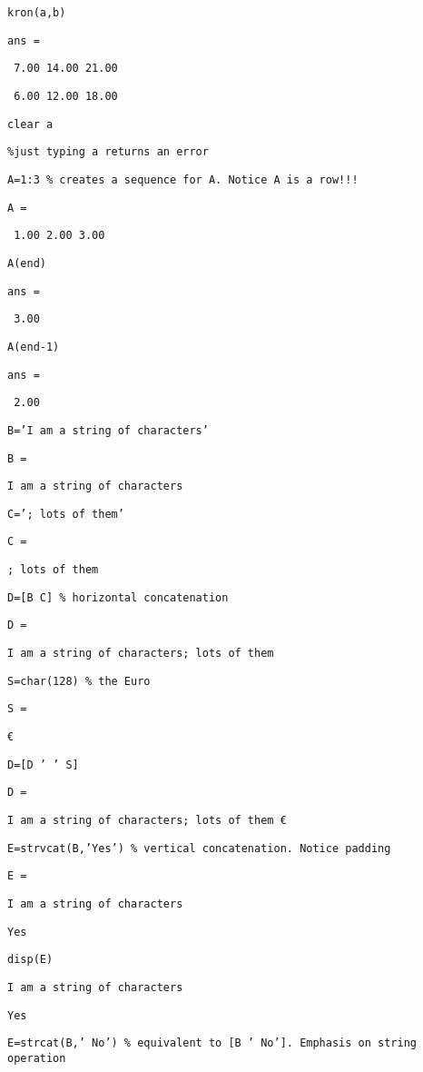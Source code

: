 \documentclass[12pt,a4paper]{article}
\begin{document}
\texttt{kron(a,b)}

\texttt{ans =}

\texttt{\ 7.00 14.00 21.00}

\texttt{\ 6.00 12.00 18.00}

\texttt{clear a}

\texttt{\%just typing a returns an error}

\texttt{A=1:3 \% creates a sequence for A. Notice A is a row!!!}

\texttt{A =}

\texttt{\ 1.00 2.00 3.00}

\texttt{A(end)}

\texttt{ans =}

\texttt{\ 3.00}

\texttt{A(end-1)}

\texttt{ans =}

\texttt{\ 2.00}

\texttt{B='I am a string of characters'}

\texttt{B =}

\texttt{I am a string of characters}

\texttt{C='; lots of them'}

\texttt{C =}

\texttt{; lots of them}

\texttt{D=[B C] \% horizontal concatenation}

\texttt{D =}

\texttt{I am a string of characters; lots of them}

\texttt{S=char(128) \% the Euro}

\texttt{S =}

\texttt{\euro }

\texttt{D=[D ' ' S] }

\texttt{D =}

\texttt{I am a string of characters; lots of them \euro }

\texttt{E=strvcat(B,'Yes') \% vertical concatenation. Notice padding}

\texttt{E =}

\texttt{I am a string of characters}

\texttt{Yes }

\texttt{disp(E)}

\texttt{I am a string of characters}

\texttt{Yes }

\texttt{E=strcat(B,' No') \% equivalent to [B ' No']. Emphasis on string
operation}
\end{document}
